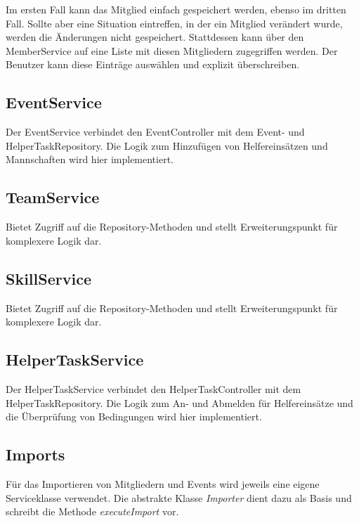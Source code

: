 	\noindent	
	Im ersten Fall kann das Mitglied einfach gespeichert werden, ebenso im dritten Fall. Sollte aber eine Situation eintreffen, in der ein Mitglied verändert wurde, werden die Änderungen nicht gespeichert. Stattdessen kann über den MemberService auf eine Liste mit diesen Mitgliedern zugegriffen werden. Der Benutzer kann diese Einträge auswählen und explizit überschreiben.
	
	
	\subsection{EventService}
	Der EventService verbindet den EventController mit dem Event- und HelperTaskRepository. Die Logik zum Hinzufügen von Helfereinsätzen und Mannschaften wird hier implementiert.
	
	\subsection{TeamService}
	Bietet Zugriff auf die Repository-Methoden und stellt Erweiterungspunkt für komplexere Logik dar.
	
	\subsection{SkillService}
	Bietet Zugriff auf die Repository-Methoden und stellt Erweiterungspunkt für komplexere Logik dar.
	
	\subsection{HelperTaskService}
	Der HelperTaskService verbindet den HelperTaskController mit dem HelperTaskRepository. Die Logik zum An- und Abmelden für Helfereinsätze und die Überprüfung von Bedingungen wird hier implementiert.
		
	
	\subsection{Imports}
	Für das Importieren von Mitgliedern und Events wird jeweils eine eigene Serviceklasse verwendet. Die abstrakte Klasse \textit{Importer} dient dazu als Basis und schreibt die Methode \textit{executeImport} vor.
	

